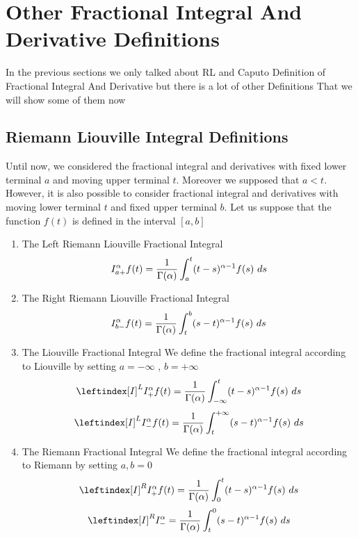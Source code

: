 \section{Other Fractional Integral And Derivative Definitions}
In the previous sections we only talked about RL and Caputo Definition of Fractional Integral And Derivative
but there is a lot of other Definitions That we will show some of them now 

\subsection{Riemann Liouville Integral Definitions}
Until now, we considered the fractional integral and derivatives with fixed
lower terminal $a$ and moving upper terminal $t$. 
Moreover we supposed that $a < t$. However, it is also possible to consider fractional integral and derivatives
with moving lower terminal $t$ and fixed upper terminal $b$.
Let us suppose that the function $f(t)$ is defined in the interval $[a, b]$
\begin{enumerate}
        \item The Left Riemann Liouville Fractional Integral
        \begin{equation}
            I_{a+}^{\alpha} f(t) = \frac{1}{\Gamma(\alpha)}\int_{a}^{t} (t-s)^{\alpha-1}f(s) \,\, ds
        \end{equation}
        \item The Right Riemann Liouville Fractional Integral
        \begin{equation}
            I_{b-}^{\alpha} f(t) = \frac{1}{\Gamma(\alpha)}\int_{t}^{b} (s-t)^{\alpha-1}f(s) \,\, ds
        \end{equation}
        \item The Liouville Fractional Integral
        We define the fractional integral according to Liouville by setting $a = -\infty$ , $b = +\infty$
        \begin{equation}
            \leftindex[I]^L {I_{+}^{\alpha}} f(t) = \frac{1}{\Gamma(\alpha)}\int_{-\infty}^{t} (t-s)^{\alpha-1}f(s) \hquad ds
        \end{equation}
        \begin{equation}
            \leftindex[I]^L {I_{-}^{\alpha}} f(t) = \frac{1}{\Gamma(\alpha)}\int_{t}^{+\infty} (s-t)^{\alpha-1}f(s) \hquad ds
        \end{equation}
        \item The Riemann Fractional Integral
        We define the fractional integral according to Riemann by setting $a,b = 0$
        \begin{equation}
            \leftindex[I]^R {I_{+}^{\alpha}} f(t) = \frac{1}{\Gamma(\alpha)}\int_{0}^{t} (t-s)^{\alpha-1}f(s) \hquad ds
        \end{equation}
        \begin{equation}
            \leftindex[I]^R {I_{-}^{\alpha}} = \frac{1}{\Gamma(\alpha)}\int_{t}^{0} (s-t)^{\alpha-1}f(s) \hquad ds
        \end{equation}
\end{enumerate}
